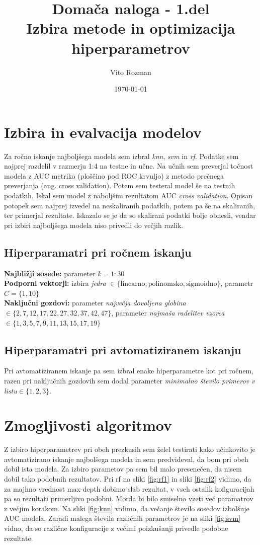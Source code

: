 \documentclass[12pt]{article}
\title{Domača naloga - 1.del \\
\large Izbira metode in optimizacija hiperparametrov}
\begin{document}
    
\author{Vito Rozman}
\date{\today}
\maketitle



\section{Izbira in evalvacija modelov}

Za ročno iskanje najboljšega modela sem izbral \emph{knn}, \emph{svm} in \emph{rf}. 
Podatke sem najprej razdelil v razmerju 1:4 na testne in učne. Na učnih sem preverjal 
točnost modela z AUC metriko (ploščino pod ROC krvuljo) z metodo prečnega preverjanja 
(ang. cross validation).
Potem sem testeral model še na testnih podatkih. Iskal sem model z naboljšim rezultatom AUC 
\emph{cross validation}.
Opisan potopek sem najprej izvedel na neskaliranih podatkih, potem pa še na skaliranih, 
ter primerjal
rezultate. Iskazalo se je da so skalirani podatki bolje obnesli, vendar pri izbiri 
najboljšega modela niso privedli do večjih razlik.
\subsection{Hiperparamatri pri ročnem iskanju}
\textbf{Najbližji sosede:} parameter $k=1:30$\\
\textbf{Podporni vektorji:} izbira 
\emph{jedra} $\in \{\text{linearno}, \text{polinomsko}, \text{sigmoidno}\}$, 
parametr $C=\{1, 10\}$\\
\textbf{Naključni gozdovi:} parameter \emph{največja dovoljena globina} $\in \{2, 7, 12, 17, 22, 27, 32, 37, 42, 47\}$,
parameter \emph{najmaša radelitev vzorca} $\in \{1, 3, 5, 7, 9, 11, 13, 15, 17, 19\}$
\subsection{Hiperparamatri pri avtomatiziranem iskanju}
Pri avtomatiziranem iskanje pa sem izbral enake hiperparametre kot pri ročnem, razen pri naključnih gozdovih 
sem dodal parameter \emph{minimalno število primerov v listu}$\in \{1, 2, 3\}$.

\section{Zmogljivosti algoritmov}

Z izbiro hiperparametrev pri obeh prezkusih sem želel testirati kako učinkovito je avtomatizirano
iskanje najbolšega modela in sem predvideval, da bom pri obeh dobil ista modela. Za izbiro
parametov pa sem bil malo presenečen, da nisem dobil tako podobnih rezultatov. Pri rf na 
sliki \ref{fig:rf1} in sliki \ref{fig:rf2} vidimo, da za majhno vrednost max-depth dobimo 
slab rezultat, v vseh ostalik kofiguracijah pa so rezultati primerljivo podobni. Morda 
bi bilo smiselno vzeti več paramatrov z večjim korakom. Na sliki \ref{fig:knn} vidimo, da večanje 
število sosedov izbolšuje AUC modela. Zaradi malega števila različnih parametrov je na sliki 
\ref{fig:svm} vidno, da so različne konfiguracije z večimi poizkušanji privedle podobne
rezultate.
\end{document}
